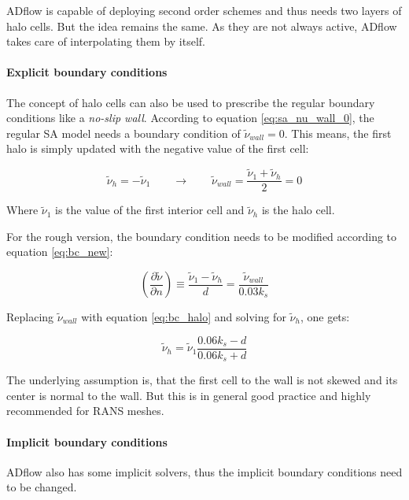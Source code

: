 ADflow is capable of deploying second order schemes and thus needs two layers of
halo cells. But the idea remains the same. As they are not always active, ADflow
takes care of interpolating them by itself.

\paragraph{Explicit boundary conditions}
The concept of halo cells can also be used to prescribe the regular boundary
conditions like a \textit{no-slip wall}. According to equation
\ref{eq:sa_nu_wall_0}, the regular SA model needs a boundary condition of
$\tilde \nu_{wall} = 0$. This means, the first halo is simply updated with the
negative value of the first cell:

\begin{equation}
  \tilde \nu_{h} = - \tilde \nu_{1} \qquad \rightarrow \qquad
  \tilde \nu_{wall} = \frac{\tilde \nu_{1} + \tilde \nu_{h}}{2} = 0
  \label{eq:bc_halo}
\end{equation}

\noindent Where $\tilde \nu_{1}$ is the value of the first interior cell and
$\tilde \nu_{h}$ is the halo cell.

For the rough version, the boundary condition needs to be modified according to
equation \ref{eq:bc_new}:

\begin{equation}
  \left( \frac{\partial \tilde \nu}{\partial n} \right) \equiv
  \frac{\tilde \nu_{1} - \tilde \nu_{h}}{d} =
  \frac{\tilde \nu_{wall}}{0.03 k_{s}}
\end{equation}

\noindent Replacing $\tilde \nu_{wall}$ with equation \ref{eq:bc_halo} and
solving for $\tilde \nu_{h}$, one gets:

\begin{equation}
  \tilde \nu_{h} = \tilde \nu_{1} \frac{0.06 k_{s} - d}{0.06 k_{s} + d}
\end{equation}

\noindent The underlying assumption is, that the first cell to the wall is not
skewed and its center is normal to the wall. But this is in general good practice
and highly recommended for RANS meshes.


\paragraph{Implicit boundary conditions}
ADflow also has some implicit solvers, thus the implicit boundary conditions need to be changed.

